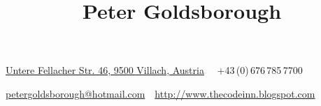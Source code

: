 





\title{Peter Goldsborough}

\begin{subtitle}
\href{https://www.google.com/maps/place/46°37'42.6%22N+13°49'28.0%22E}
{Untere Fellacher Str. 46, 9500 Villach, Austria}
\, \BulletSymbol\,
+43\,(0)\,676\,785\,7700
\par
\href{mailto:petergoldsborough@hotmail.com}
{petergoldsborough@hotmail.com}
\,\BulletSymbol\,
\href{http://www.thecodeinn.blogspot.com}
{http://www.thecodeinn.blogspot.com}
\end{subtitle}

